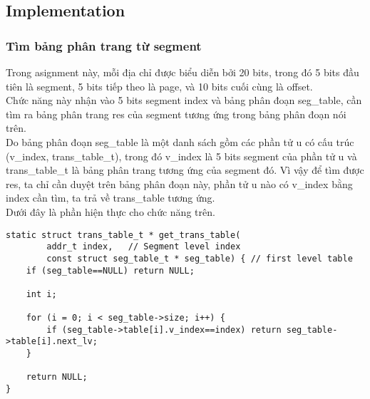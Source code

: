 \documentclass[10pt]{article}
\newcommand\tab[1][1cm]{\hspace*{#1}}
\begin{document}
\subsection{Implementation}
\subsubsection{Tìm bảng phân trang từ segment}
\tab[0.5cm] Trong asignment này, mỗi địa chỉ được biểu diễn bởi 20 bits, trong đó 5 bits đầu tiên là segment, 5 bits tiếp theo là page, và 10 bits cuối cùng là offset. \\
\tab[0.5cm] Chức năng này nhận vào 5 bits segment index và bảng phân đoạn seg\_table, cần tìm ra bảng phân trang res của segment tương ứng trong bảng phân đoạn nói trên. \\
\tab[0.5cm] Do bảng phân đoạn seg\_table là một danh sách gồm các phần tử u có cấu trúc (v\_index, trans\_table\_t), trong đó v\_index là 5 bits segment của phần tử u và trans\_table\_t là bảng phân trang tương ứng của segment đó. Vì vậy để tìm được res, ta chỉ cần duyệt trên bảng phân đoạn này, phần tử u nào có v\_index bằng index cần tìm, ta trả về trans\_table tương ứng. \\
\tab[0.5cm] Dưới đây là phần hiện thực cho chức năng trên.
\begin{lstlisting}
static struct trans_table_t * get_trans_table(
        addr_t index,   // Segment level index
        const struct seg_table_t * seg_table) { // first level table
    if (seg_table==NULL) return NULL;
    
    int i;
    
    for (i = 0; i < seg_table->size; i++) {
        if (seg_table->table[i].v_index==index) return seg_table->table[i].next_lv;
    }

    return NULL;
}
\end{lstlisting}
\end{document}
